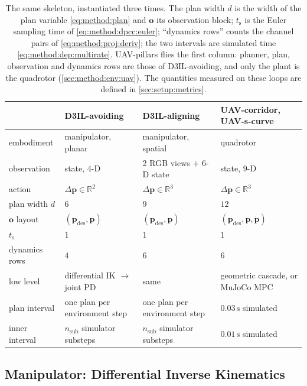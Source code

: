 \documentclass[headsepline,footsepline,footinclude=false,oneside,fontsize=11pt,paper=a4,listof=totoc,bibliography=totoc]{scrbook}
\theoremstyle{definition}
\theoremstyle{plain}
\theoremstyle{remark}
\newcommand{\vect}[1]{\boldsymbol{#1}}
\newcommand{\sidx}[1]{_{\textrm{#1}}}
\newcommand{\R}{\mathbb{R}}                    %
\begin{document}
\begin{table}[htpb]
  \caption[Embodiment instantiation]{The same skeleton, instantiated three times. The plan width $d$
  is the width of the plan variable \eqref{eq:method:plan} and $\vect{o}$ its observation block;
  $t\sidx{s}$ is the Euler sampling time of \eqref{eq:method:dpcc:euler}; ``dynamics rows'' counts the
  channel pairs of \eqref{eq:method:proj:deriv}; the two intervals are simulated time
  \eqref{eq:method:dep:multirate}. UAV-pillars flies the first column: planner, plan, observation and
  dynamics rows are those of D3IL-avoiding, and only the plant is the quadrotor
  (\autoref{sec:method:env:uav}). The quantities measured on these loops are defined in
  \autoref{sec:setup:metrics}.}
  \label{tab:embodiments}
  \centering\small
  \begin{tabularx}{\linewidth}{lLLL}
    \toprule
     & D3IL-avoiding & D3IL-aligning & UAV-corridor, UAV-s-curve \\
    \midrule
    embodiment      & manipulator, planar   & manipulator, spatial      & quadrotor \\
    observation     & state, $4$-D          & 2 RGB views $+$ $6$-D state & state, $9$-D \\
    action          & $\Delta\vect{p}\in\R^{2}$ & $\Delta\vect{p}\in\R^{3}$ & $\Delta\vect{p}\in\R^{3}$ \\
    plan width $d$  & $6$                   & $9$                       & $12$ \\
    $\vect{o}$ layout & $(\vect{p}\sidx{des},\vect{p})$ & $(\vect{p}\sidx{des},\vect{p})$ & $(\vect{p}\sidx{des},\vect{p},\dot{\vect{p}})$ \\
    $t\sidx{s}$     & $1$                   & $1$                       & $1$ \\
    dynamics rows   & $4$                   & $6$                       & $6$ \\
    low level       & differential \ac{IK} $\rightarrow$ joint PD & same & geometric cascade, or MuJoCo MPC \\
    plan interval   & one plan per environment step & one plan per environment step & $0.03\,\textrm{s}$ simulated \\
    inner interval  & $n\sidx{sub}$ simulator substeps & $n\sidx{sub}$ simulator substeps & $0.01\,\textrm{s}$ simulated \\
    \bottomrule
  \end{tabularx}
\end{table}

\subsection{Manipulator: Differential Inverse Kinematics}\label{sec:method:ik}
\end{document}

